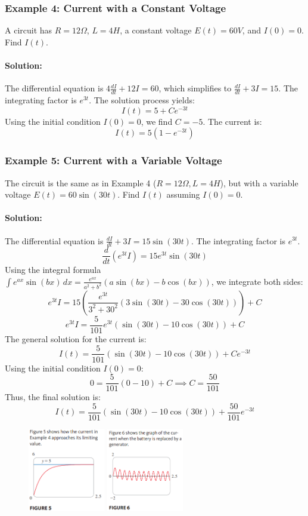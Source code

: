 \documentclass{article}
\begin{document}
\subsubsection*{Example 4: Current with a Constant Voltage}
A circuit has $R=12\Omega$, $L=4H$, a constant voltage $E(t)=60V$, and $I(0)=0$. Find $I(t)$.

\paragraph{Solution:}
The differential equation is $4 \frac{dI}{dt} + 12I = 60$, which simplifies to $\frac{dI}{dt} + 3I = 15$. The integrating factor is $e^{3t}$. The solution process yields:
\[I(t) = 5 + Ce^{-3t}\]
Using the initial condition $I(0)=0$, we find $C=-5$. The current is:
\[I(t) = 5(1 - e^{-3t})\]

\subsubsection*{Example 5: Current with a Variable Voltage}
The circuit is the same as in Example 4 ($R=12\Omega, L=4H$), but with a variable voltage $E(t)=60\sin(30t)$. Find $I(t)$ assuming $I(0)=0$.

\paragraph{Solution:}
The differential equation is $\frac{dI}{dt} + 3I = 15\sin(30t)$. The integrating factor is $e^{3t}$.
\[\frac{d}{dt}(e^{3t}I) = 15e^{3t}\sin(30t)\]
Using the integral formula $\int e^{ax}\sin(bx) \, dx = \frac{e^{ax}}{a^2+b^2}(a\sin(bx) - b\cos(bx))$, we integrate both sides:
\[e^{3t}I = 15 \left( \frac{e^{3t}}{3^2+30^2}(3\sin(30t) - 30\cos(30t)) \right) + C\]
\[e^{3t}I = \frac{5}{101}e^{3t}(\sin(30t) - 10\cos(30t)) + C\]
The general solution for the current is:
\[I(t) = \frac{5}{101}(\sin(30t) - 10\cos(30t)) + Ce^{-3t}\]
Using the initial condition $I(0)=0$:
\[0 = \frac{5}{101}(0 - 10) + C \implies C = \frac{50}{101}\]
Thus, the final solution is:
\[I(t) = \frac{5}{101}(\sin(30t) - 10\cos(30t)) + \frac{50}{101}e^{-3t}\]
\begin{figure}[htbp]
    \centering
    \includegraphics[width=0.3\textwidth]{graph8.png}
    \includegraphics[width=0.3\textwidth]{graph9.png} %
\end{figure}
\end{document}
